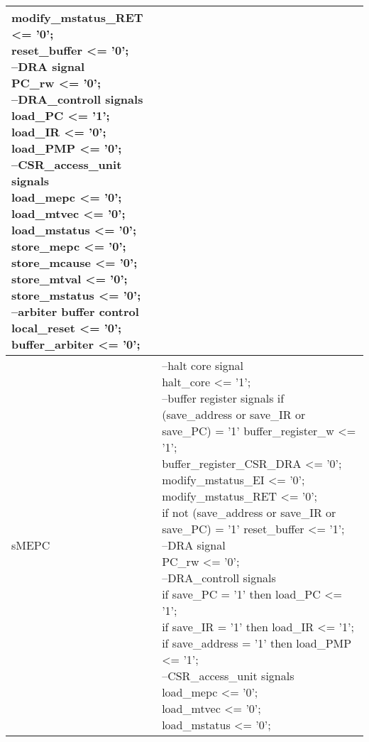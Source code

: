\begin{longtable}{| p{} | p{} |}
{			modify\_mstatus\_RET <= '0';\\
			reset\_buffer <= '0';\\
			--DRA signal\\
			PC\_rw <= '0';\\
			--DRA\_controll signals\\
			load\_PC <= '1';\\
			load\_IR <= '0';\\
			load\_PMP <= '0';\\
			--CSR\_access\_unit signals\\
			load\_mepc <= '0';\\
			load\_mtvec <= '0';\\
			load\_mstatus <= '0';\\
			store\_mepc <= '0';\\
			store\_mcause <= '0';\\
			store\_mtval <= '0';\\
			store\_mstatus <= '0';\\
			--arbiter buffer control\\
			local\_reset <= '0';\\
			buffer\_arbiter <= '0';} \\
		\hline
		sMEPC & \makecell{--halt core signal\\
		halt\_core <= '1';\\
		--buffer register signals
		if (save\_address or save\_IR or save\_PC) = '1' buffer\_register\_w <= '1';\\
		buffer\_register\_CSR\_DRA <= '0';\\
		modify\_mstatus\_EI <= '0';\\
		modify\_mstatus\_RET <= '0';\\
		if not (save\_address or save\_IR or save\_PC) = '1' reset\_buffer <= '1';\\
		--DRA signal\\
		PC\_rw <= '0';\\
		--DRA\_controll signals\\
		if save\_PC = '1' then load\_PC <= '1';\\
		if save\_IR = '1' then load\_IR <= '1';\\
		if save\_address = '1' then load\_PMP <= '1';\\
		--CSR\_access\_unit signals\\
		load\_mepc <= '0';\\
		load\_mtvec <= '0';\\
		load\_mstatus <= '0';\\
}
\end{longtable}
